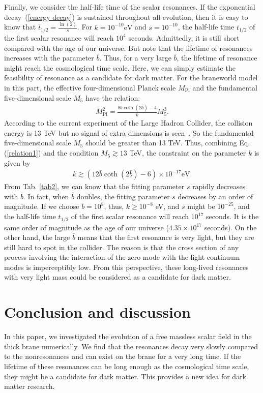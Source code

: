 Finally, we consider the half-life time of the scalar resonances. If the exponential decay~(\ref{energy decay}) is sustained throughout all evolution, then it is easy to know that $\bar{t}_{1/2}=\frac{\ln(2)}{s}$. For $k=10^{-10}\text{eV}$ and $s=10^{-10}$, the half-life time $t_{1/2}$ of the first scalar resonance will reach $10^{4}$ seconds. Admittedly, it is still short compared with the age of our universe. But note that the lifetime of resonances increases with the parameter $\bar{b}$. Thus, for a very large $\bar{b}$, the lifetime of resonance might reach the cosmological time scale.
Here, we can simply estimate the feasibility of resonance as a candidate for dark matter. For the braneworld model in this part, the effective four-dimensional Planck scale $M_{\text{Pl}}$ and the fundamental five-dimensional scale $M_{5}$ have the relation:
\begin{eqnarray}
M_{\text{Pl}}^{2}=\frac{8\bar{b}\coth(2\bar{b})-4}{k}M_{5}^{3}.\label{relation1}
\end{eqnarray}
According to the current experiment of the Large Hadron Collider, the collision energy is 13 TeV but no signal of extra dimensions is seen~\cite{ATLAS:2017tlw}. So the fundamental five-dimensional scale $M_{5}$ should be greater than 13 TeV. Thus, combining Eq. (\ref{relation1}) and the condition $M_{5}\gtrsim 13$ TeV, the constraint on the parameter $k$ is given by
\begin{eqnarray}
k\gtrsim(12\bar{b}\coth(2\bar{b})-6)\times 10^{-17} \text{eV}.
\end{eqnarray}
From Tab. \ref{tab2}, we can know that the fitting parameter $s$ rapidly decreases with $\bar{b}$. In fact, when $\bar{b}$ doubles, the fitting parameter $s$ decreases by an order of magnitude. If we choose $\bar{b}=10^{8}$, thus, $k\geq 10^{-8}$ eV, and $s$ might be $10^{-25}$, and the half-life time $t_{1/2}$ of the first scalar resonance will reach $10^{17}$ seconds. It is the same order of magnitude as the age of our universe ($4.35\times 10^{17}$ seconds). On the other hand, the large $\bar{b}$ means that the first resonance is very light, but they are still hard to spot in the collider. The reason is that the cross section of any process involving the interaction of the zero mode with the light continuum modes is imperceptibly low.
From this perspective, these long-lived resonances with very light mass could be considered as a candidate for dark matter.




\section{Conclusion and discussion}
\label{Conclusion}
In this paper, we investigated the evolution of a free massless scalar field in the thick brane numerically. We find that the resonances decay very slowly compared to the nonresonances and can exist on the brane for a very long time. If the lifetime of these resonances can be long enough as the cosmological time scale, they might be a candidate for dark matter. This provides a new idea for dark matter research.

